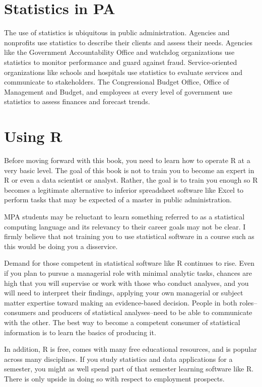 \documentclass[
]{book}
\begin{document}
\hypertarget{statistics-in-pa}{%
\section{Statistics in PA}\label{statistics-in-pa}}

The use of statistics is ubiquitous in public administration. Agencies and nonprofits use statistics to describe their clients and assess their needs. Agencies like the Government Accountability Office and watchdog organizations use statistics to monitor performance and guard against fraud. Service-oriented organizations like schools and hospitals use statistics to evaluate services and communicate to stakeholders. The Congressional Budget Office, Office of Management and Budget, and employees at every level of government use statistics to assess finances and forecast trends.

\hypertarget{using-r}{%
\section{Using R}\label{using-r}}

Before moving forward with this book, you need to learn how to operate R at a very basic level. The goal of this book is not to train you to become an expert in R or even a data scientist or analyst. Rather, the goal is to train you enough so R becomes a legitimate alternative to inferior spreadsheet software like Excel to perform tasks that may be expected of a master in public administration.

MPA students may be reluctant to learn something referred to as a statistical computing language and its relevancy to their career goals may not be clear. I firmly believe that not training you to use statistical software in a course such as this would be doing you a disservice.

Demand for those competent in statistical software like R continues to rise. Even if you plan to pursue a managerial role with minimal analytic tasks, chances are high that you will supervise or work with those who conduct analyses, and you will need to interpret their findings, applying your own managerial or subject matter expertise toward making an evidence-based decision. People in both roles--consumers and producers of statistical analyses--need to be able to communicate with the other. The best way to become a competent consumer of statistical information is to learn the basics of producing it.

In addition, R is free, comes with many free educational resources, and is popular across many disciplines. If you study statistics and data applications for a semester, you might as well spend part of that semester learning software like R. There is only upside in doing so with respect to employment prospects.
\end{document}
